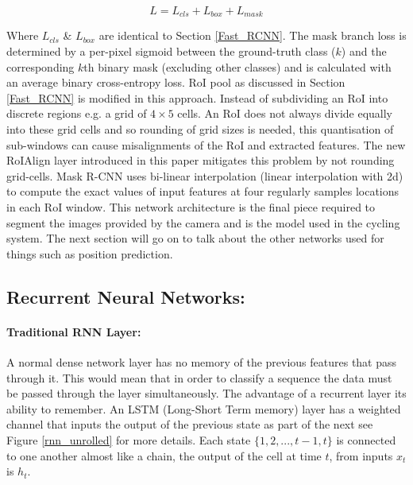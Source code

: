 \documentclass[11pt,twoside]{report}
\begin{document}
\begin{equation}
\label{maskrcnnloss}
L = L_{cls} + L_{box} + L_{mask}
\end{equation}

Where $L_{cls}$ \& $L_{box}$ are identical to Section \ref{Fast_RCNN}. The mask branch loss is determined by a per-pixel sigmoid between the ground-truth class ($k$) and the corresponding $k$th binary mask (excluding other classes) and is calculated with an average binary cross-entropy loss.
\newline \newline
RoI pool as discussed in Section \ref{Fast_RCNN} is modified in this approach. Instead of subdividing an RoI into discrete regions e.g. a grid of $4 \times 5$ cells. An RoI does not always divide equally into these grid cells and so rounding of grid sizes is needed, this quantisation of sub-windows can cause misalignments of the RoI and extracted features. The new RoIAlign layer introduced in this paper mitigates this problem by not rounding grid-cells. Mask R-CNN uses bi-linear interpolation (linear interpolation with 2d) to compute the exact values of input features at four regularly samples locations in each RoI window.
\newline \newline
This network architecture is the final piece required to segment the images provided by the camera and is the model used in the cycling system. The next section will go on to talk about the other networks used for things such as position prediction.
\subsection{Recurrent Neural Networks:}

\paragraph{Traditional RNN Layer:}A normal dense network layer has no memory of the previous features that pass through it. This would mean that in order to classify a sequence the data must be passed through the layer simultaneously. The advantage of a recurrent layer its ability to remember. An LSTM (Long-Short Term memory) layer has a weighted channel that inputs the output of the previous state as part of the next see Figure \ref{rnn_unrolled} for more details. Each state $ \{ 1,2,...,t-1,t \}$ is connected to one another almost like a chain, the output of the cell at time $t$, from inputs $x_{t}$ is $h_{t}$.
\end{document}
